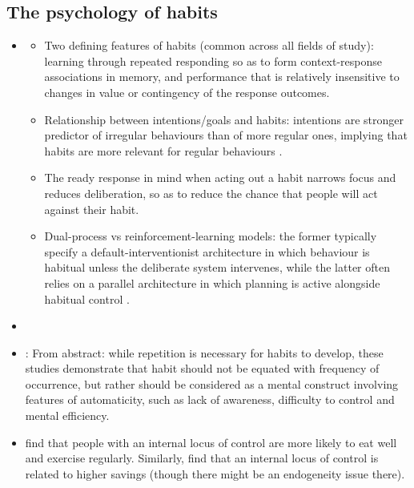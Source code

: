 \documentclass[a4paper, 11pt]{report}
\begin{document}
\subsection{The psychology of habits} %

\label{sub:the_psychology_of_habits}

\begin{itemize}

	\item \citet{wood2016psychology}
	\begin{itemize}
		\item Two defining features of habits (common across all fields of study): learning through repeated responding so as to form context-response associations in memory, and performance that is relatively insensitive to changes in value or contingency of the response outcomes.

		\item Relationship between intentions/goals and habits: intentions are stronger predictor of irregular behaviours than of more regular ones, implying that habits are more relevant for regular behaviours \citet{ouellette1998habit}.

		\item The ready response in mind when acting out a habit narrows focus and reduces deliberation, so as to reduce the chance that people will act against their habit.

		\item Dual-process vs reinforcement-learning models: the former typically specify a default-interventionist architecture in which behaviour is habitual unless the deliberate system intervenes, while the latter often relies on a parallel architecture in which planning is active alongside habitual control \citep{evans2013dual}.
	\end{itemize}

	\item \citet{wood2009habitual}

	\item \citet{verplanken2006beyond}: From abstract: while repetition is necessary for habits to develop, these studies demonstrate that habit should not be equated with frequency of occurrence, but rather should be considered as a mental construct involving features of automaticity, such as lack of awareness, difficulty to control and mental efficiency.

	\item \citet{cobb2014healthy} find that people with an internal locus of control are more likely to eat well and exercise regularly. Similarly, \citet{cobb2016locus} find that an internal locus of control is related to higher savings (though there might be an endogeneity issue there).
\end{itemize}
\end{document}
